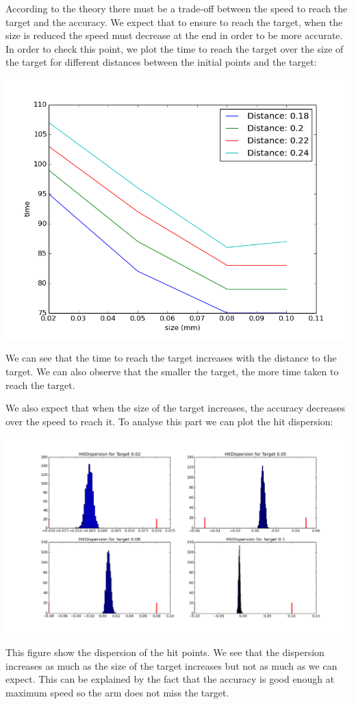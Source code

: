 \documentclass[pdftex,a4paper,11pt]{report}
\begin{document}
According to the theory there must be a trade-off between the speed to reach the target and the accuracy. We expect that to ensure to reach the target, when the size is reduced the speed must decrease at the end in order to be more accurate.
In order to check this point, we plot the time to reach the target over the size of the target for different distances between the initial points and the target:
\begin{center}
\includegraphics[scale=0.5]{figures/timeDistance.png}
\end{center}
We can see that the time to reach the target increases with the distance to the target.
We can also observe that the smaller the target, the more time taken to reach the target.

We also expect that when the size of the target increases, the accuracy decreases over the speed to reach it.
To analyse this part we can plot the hit dispersion:
\begin{center}
\includegraphics[scale=0.3]{figures/hitDispAll0p1_0p4175.png}
\end{center}
This figure show the dispersion of the hit points. We see that the dispersion increases as much as the size of the target increases but not as much as we can expect.
This can be explained by the fact that the accuracy is good enough at maximum speed so the arm does not miss the target.
\end{document}
